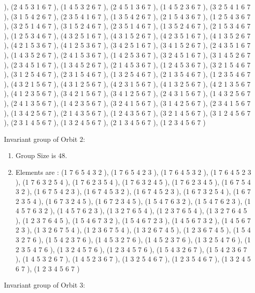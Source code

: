 \documentclass[12pt]{article}
\begin{document}
\begin{enumerate}
 ), (2 4 5 3 1 6 7  ), (1 4 5 3 2 6 7  ), (2 4 5 1 3 6 7  ), (1 4 5 2 3 6 7  ), (3 2 5 4 1 6 7  ), (3 1 5 4 2 6 7  ), (2 3 5 4 1 6 7  ), (1 3 5 4 2 6 7  ), (2 1 5 4 3 6 7  ), (1 2 5 4 3 6 7  ), (3 2 5 1 4 6 7  ), (3 1 5 2 4 6 7  ), (2 3 5 1 4 6 7  ), (1 3 5 2 4 6 7  ), (2 1 5 3 4 6 7  ), (1 2 5 3 4 6 7  ), (4 3 2 5 1 6 7  ), (4 3 1 5 2 6 7  ), (4 2 3 5 1 6 7  ), (4 1 3 5 2 6 7  ), (4 2 1 5 3 6 7  ), (4 1 2 5 3 6 7  ), (3 4 2 5 1 6 7  ), (3 4 1 5 2 6 7  ), (2 4 3 5 1 6 7  ), (1 4 3 5 2 6 7  ), (2 4 1 5 3 6 7  ), (1 4 2 5 3 6 7  ), (3 2 4 5 1 6 7  ), (3 1 4 5 2 6 7  ), (2 3 4 5 1 6 7  ), (1 3 4 5 2 6 7  ), (2 1 4 5 3 6 7  ), (1 2 4 5 3 6 7  ), (3 2 1 5 4 6 7  ), (3 1 2 5 4 6 7  ), (2 3 1 5 4 6 7  ), (1 3 2 5 4 6 7  ), (2 1 3 5 4 6 7  ), (1 2 3 5 4 6 7  ), (4 3 2 1 5 6 7  ), (4 3 1 2 5 6 7  ), (4 2 3 1 5 6 7  ), (4 1 3 2 5 6 7  ), (4 2 1 3 5 6 7  ), (4 1 2 3 5 6 7  ), (3 4 2 1 5 6 7  ), (3 4 1 2 5 6 7  ), (2 4 3 1 5 6 7  ), (1 4 3 2 5 6 7  ), (2 4 1 3 5 6 7  ), (1 4 2 3 5 6 7  ), (3 2 4 1 5 6 7  ), (3 1 4 2 5 6 7  ), (2 3 4 1 5 6 7  ), (1 3 4 2 5 6 7  ), (2 1 4 3 5 6 7  ), (1 2 4 3 5 6 7  ), (3 2 1 4 5 6 7  ), (3 1 2 4 5 6 7  ), (2 3 1 4 5 6 7  ), (1 3 2 4 5 6 7  ), (2 1 3 4 5 6 7  ), (1 2 3 4 5 6 7  )
\end{enumerate}
Invariant group of Orbit $2$:
\begin{enumerate}
\item Group Size is $48$.
\item Elements are : (1 7 6 5 4 3 2  ), (1 7 6 5 4 2 3  ), (1 7 6 4 5 3 2  ), (1 7 6 4 5 2 3  ), (1 7 6 3 2 5 4  ), (1 7 6 2 3 5 4  ), (1 7 6 3 2 4 5  ), (1 7 6 2 3 4 5  ), (1 6 7 5 4 3 2  ), (1 6 7 5 4 2 3  ), (1 6 7 4 5 3 2  ), (1 6 7 4 5 2 3  ), (1 6 7 3 2 5 4  ), (1 6 7 2 3 5 4  ), (1 6 7 3 2 4 5  ), (1 6 7 2 3 4 5  ), (1 5 4 7 6 3 2  ), (1 5 4 7 6 2 3  ), (1 4 5 7 6 3 2  ), (1 4 5 7 6 2 3  ), (1 3 2 7 6 5 4  ), (1 2 3 7 6 5 4  ), (1 3 2 7 6 4 5  ), (1 2 3 7 6 4 5  ), (1 5 4 6 7 3 2  ), (1 5 4 6 7 2 3  ), (1 4 5 6 7 3 2  ), (1 4 5 6 7 2 3  ), (1 3 2 6 7 5 4  ), (1 2 3 6 7 5 4  ), (1 3 2 6 7 4 5  ), (1 2 3 6 7 4 5  ), (1 5 4 3 2 7 6  ), (1 5 4 2 3 7 6  ), (1 4 5 3 2 7 6  ), (1 4 5 2 3 7 6  ), (1 3 2 5 4 7 6  ), (1 2 3 5 4 7 6  ), (1 3 2 4 5 7 6  ), (1 2 3 4 5 7 6  ), (1 5 4 3 2 6 7  ), (1 5 4 2 3 6 7  ), (1 4 5 3 2 6 7  ), (1 4 5 2 3 6 7  ), (1 3 2 5 4 6 7  ), (1 2 3 5 4 6 7  ), (1 3 2 4 5 6 7  ), (1 2 3 4 5 6 7  )
\end{enumerate}
Invariant group of Orbit $3$:
\end{document}
